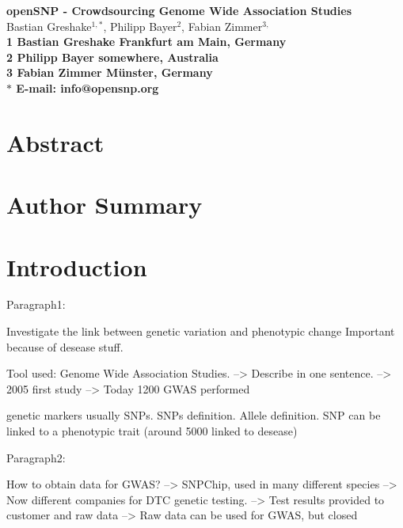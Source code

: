 \documentclass[10pt]{article}
\date{}
\begin{document}
\begin{flushleft}
{\Large
\textbf{openSNP - Crowdsourcing Genome Wide Association Studies}
}
\\
Bastian Greshake$^{1,\ast}$, 
Philipp Bayer$^{2}$, 
Fabian Zimmer$^{3,}$
\\
\bf{1} Bastian Greshake Frankfurt am Main, Germany
\\
\bf{2} Philipp Bayer somewhere, Australia
\\
\bf{3} Fabian Zimmer M\"unster, Germany
\\
$\ast$ E-mail: info@opensnp.org
\end{flushleft}

\section*{Abstract}

\section*{Author Summary}

\section*{Introduction}



Paragraph1:


Investigate the link between genetic variation and phenotypic change
Important because of desease stuff.

Tool used: Genome Wide Association Studies.
--> Describe in one sentence.
--> 2005 first study
--> Today 1200 GWAS performed

genetic markers usually SNPs.
SNPs definition. Allele definition.
SNP can be linked to a phenotypic trait (around 5000 linked to desease)
 
Paragraph2:

How to obtain data for GWAS?
--> SNPChip, used in many different species
--> Now different companies for DTC genetic testing.
--> Test results provided to customer and raw data
--> Raw data can be used for GWAS, but closed
\end{document}
